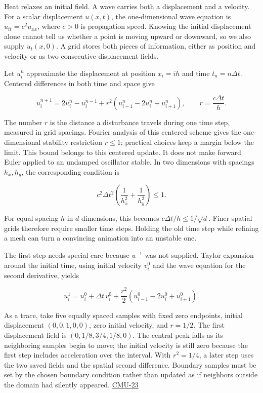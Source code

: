 Heat relaxes an initial field. A wave carries both a displacement and a velocity. For a scalar displacement \(u(x,t)\), the one-dimensional wave equation is \(u_{tt}=c^2u_{xx}\), where \(c>0\) is propagation speed. Knowing the initial displacement alone cannot tell us whether a point is moving upward or downward, so we also supply \(u_t(x,0)\). A grid stores both pieces of information, either as position and velocity or as two consecutive displacement fields.

Let \(u_i^n\) approximate the displacement at position \(x_i=i h\) and time \(t_n=n\Delta t\). Centered differences in both time and space give

\[
u_i^{n+1}=2u_i^n-u_i^{n-1}+r^2(u_{i-1}^n-2u_i^n+u_{i+1}^n),\qquad r=\frac{c\Delta t}{h}.
\]

The number \(r\) is the distance a disturbance travels during one time step, measured in grid spacings. Fourier analysis of this centered scheme gives the one-dimensional stability restriction \(r\leq1\); practical choices keep a margin below the limit. This bound belongs to this centered update. It does not make forward Euler applied to an undamped oscillator stable. In two dimensions with spacings \(h_x,h_y\), the corresponding condition is

\[
c^2\Delta t^2\left(\frac1{h_x^2}+\frac1{h_y^2}\right)\leq1.
\]

For equal spacing \(h\) in \(d\) dimensions, this becomes \(c\Delta t/h\leq1/\sqrt d\). Finer spatial grids therefore require smaller time steps. Holding the old time step while refining a mesh can turn a convincing animation into an unstable one.

The first step needs special care because \(u^{-1}\) was not supplied. Taylor expansion around the initial time, using initial velocity \(v_i^0\) and the wave equation for the second derivative, yields

\[
u_i^1=u_i^0+\Delta t\,v_i^0+\frac{r^2}{2}(u_{i-1}^0-2u_i^0+u_{i+1}^0).
\]

As a trace, take five equally spaced samples with fixed zero endpoints, initial displacement \((0,0,1,0,0)\), zero initial velocity, and \(r=1/2\). The first displacement field is \((0,1/8,3/4,1/8,0)\). The central peak falls as its neighboring samples begin to move; the initial velocity is still zero because the first step includes acceleration over the interval. With \(r^2=1/4\), a later step uses the two saved fields and the spatial second difference. Boundary samples must be set by the chosen boundary condition rather than updated as if neighbors outside the domain had silently appeared. \hyperref[04-visual-computing-ii-ch036-cmu-23---physically-based-animation-and-pdes]{CMU-23}

